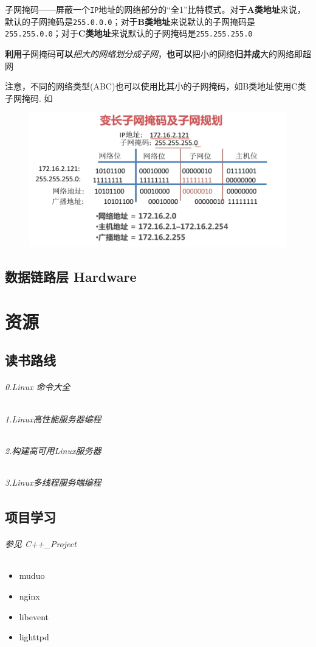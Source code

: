 \documentclass[UTF8,a4paper,8pt]{ctexbook}
\begin{document}
			子网掩码——屏蔽一个\verb|IP|地址的网络部分的“全1”比特模式。对于\textbf{A类地址}来说，默认的子网掩码是\verb|255.0.0.0|；对于\textbf{B类地址}来说默认的子网掩码是\verb|255.255.0.0|；对于\textbf{C类地址}来说默认的子网掩码是\verb|255.255.255.0|
				
			\textbf{利用}子网掩码\textbf{可以}\textit{把大的网络划分成子网}，\textbf{也可以}把小的网络\textbf{归并成}大的网络即超网
			
			注意，不同的网络类型(ABC)也可以使用比其小的子网掩码，如B类地址使用C类子网掩码.
			如\begin{figure}[h]
				\centering
				\includegraphics[scale = 0.5]{subNetMask.png}
			\end{figure}
			
	\section{数据链路层 Hardware}
	
	
	
\chapter{资源}    
\section{读书路线}
	\subparagraph{0.Linux 命令大全}
	\subparagraph{1.Linux高性能服务器编程}
	\subparagraph{2.构建高可用Linux服务器}
	\subparagraph{3.Linux多线程服务端编程}
\section{项目学习}
	\subparagraph{参见 C++\_Project}
		\begin{itemize}[itemindent = 1em]
			\item muduo
			\item nginx
			\item libevent
			\item lighttpd
		\end{itemize}
\end{document}
